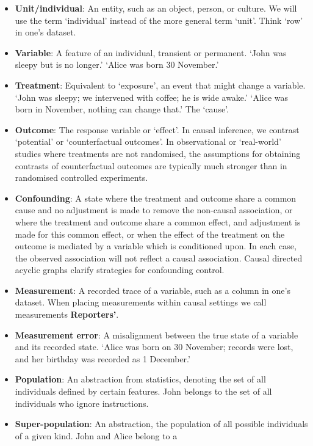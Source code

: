 \documentclass[
  single column]{article}
\begin{document}
\begin{itemize}
\item
  \textbf{Unit/individual}: An entity, such as an object, person, or
  culture. We will use the term `individual' instead of the more general
  term `unit'. Think `row' in one's dataset.
\item
  \textbf{Variable}: A feature of an individual, transient or permanent.
  `John was sleepy but is no longer.' `Alice was born 30 November.'
\item
  \textbf{Treatment}: Equivalent to `exposure', an event that might
  change a variable. `John was sleepy; we intervened with coffee; he is
  wide awake.' `Alice was born in November, nothing can change that.'
  The `cause'.
\item
  \textbf{Outcome}: The response variable or `effect'. In causal
  inference, we contrast `potential' or `counterfactual outcomes'. In
  observational or `real-world' studies where treatments are not
  randomised, the assumptions for obtaining contrasts of counterfactual
  outcomes are typically much stronger than in randomised controlled
  experiments.
\item
  \textbf{Confounding}: A state where the treatment and outcome share a
  common cause and no adjustment is made to remove the non-causal
  association, or where the treatment and outcome share a common effect,
  and adjustment is made for this common effect, or when the effect of
  the treatment on the outcome is mediated by a variable which is
  conditioned upon. In each case, the observed association will not
  reflect a causal association. Causal directed acyclic graphs clarify
  strategies for confounding control.
\item
  \textbf{Measurement}: A recorded trace of a variable, such as a column
  in one's dataset. When placing measurements within causal settings we
  call measurements \textbf{Reporters'}.
\item
  \textbf{Measurement error}: A misalignment between the true state of a
  variable and its recorded state. `Alice was born on 30 November;
  records were lost, and her birthday was recorded as 1 December.'
\item
  \textbf{Population}: An abstraction from statistics, denoting the set
  of all individuals defined by certain features. John belongs to the
  set of all individuals who ignore instructions.
\item
  \textbf{Super-population}: An abstraction, the population of all
  possible individuals of a given kind. John and Alice belong to a

\end{itemize}
\end{document}
